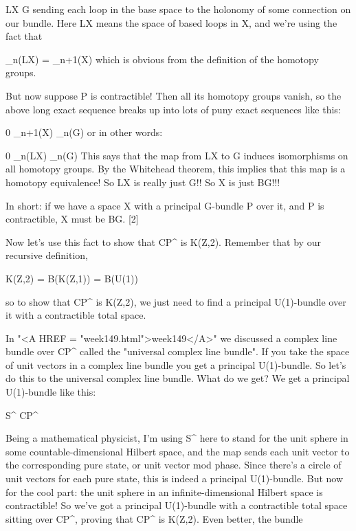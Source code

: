            LX \to  G
sending each loop in the base space to the holonomy of some connection
on our bundle.   Here LX means the space of based loops in X, and we're 
using the fact that

                   \pi _{n}(LX) = \pi _{n+1}(X)
which is obvious from the definition of the homotopy groups.

But now suppose P is contractible!  Then all its homotopy groups vanish,
so the above long exact sequence breaks up into lots of puny exact
sequences like this:

  0 \to  \pi _{n+1}(X) \to  \pi _{n}(G) 
or in other words:

  0 \to  \pi _{n}(LX) \to  \pi _{n}(G) 
This says that the map from LX to G induces isomorphisms on all homotopy
groups.   By the Whitehead theorem, this implies that this map is a
homotopy equivalence!  So LX is really just G!!  So X is just BG!!!

In short: if we have a space X with a principal G-bundle P over it, and
P is contractible, X must be BG.        [2]

Now let's use this fact to show that CP^{\infty } is K(Z,2).  Remember
that by our recursive definition, 

K(Z,2) = B(K(Z,1)) = B(U(1))

so to show that CP^{\infty } is K(Z,2), we just need to find a principal
U(1)-bundle over it with a contractible total space.  

In "<A HREF = "week149.html">week149</A>" we discussed a complex line bundle over CP^{\infty } called
the "universal complex line bundle".  If you take the space of unit
vectors in a complex line bundle you get a principal U(1)-bundle.  So
let's do this to the universal complex line bundle.  What do we get?
We get a principal U(1)-bundle like this:

S^{\infty } \to  CP^{\infty }

Being a mathematical physicist, I'm using S^{\infty } here to stand for
the unit sphere in some countable-dimensional Hilbert space, and the map
sends each unit vector to the corresponding pure state, or unit vector
mod phase.  Since there's a circle of unit vectors for each pure state,
this is indeed a principal U(1)-bundle.  But now for the cool part:  the
unit sphere in an infinite-dimensional Hilbert space is contractible! 
So we've got a principal U(1)-bundle with a contractible total space 
sitting over CP^{\infty }, proving that CP^{\infty } is K(Z,2).  Even
better, the bundle 

